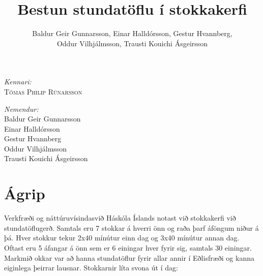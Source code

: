 \documentclass[a4paper,12pt]{article}
\begin{document}
\begin{titlepage}
\begin{center}
\begin{minipage}{0.4\textwidth}
\begin{flushleft} 
\vspace{1cm}
\emph{Kennari:}\\
\textsc{Tómas Philip Rúnarsson}\\
\end{flushleft}
\end{minipage}
\begin{minipage}{0.4\textwidth}
\begin{flushright} 
\emph{Nemendur:}\\
Baldur Geir Gunnarsson\\
Einar Halldórsson\\
Gestur Hvannberg\\
Oddur Vilhjálmsson\\
Trausti Kouichi Ásgeirsson
\end{flushright}
\end{minipage}

\end{center}

\newpage
\thispagestyle{empty} \mbox{}
\vfill
\vfill 
\thispagestyle{empty}
\cleardoublepage



\end{titlepage}

\title{Bestun stundatöflu í stokkakerfi}
\author{Baldur Geir Gunnarsson, Einar Halldórsson, Gestur Hvannberg,\\ Oddur Vilhjálmsson, Trausti Kouichi Ásgeirsson}
\maketitle

\section{Ágrip}
Verkfræði og náttúruvísindasvið Háskóla Íslands notast við stokkakerfi við stundatöflugerð. Samtals eru 7 stokkar á hverri önn og raða þarf áföngum niður á þá. Hver stokkur tekur 2x40 mínútur einn dag og 3x40 mínútur annan dag. Oftast eru 5 áfangar á önn sem er 6 einingar hver fyrir sig, samtals 30 einingar. Markmið okkar var að hanna stundatöflur fyrir allar annir í Eðlisfræði og kanna eiginlega þeirrar lausnar. Stokkarnir líta svona út í dag:
\end{document}
